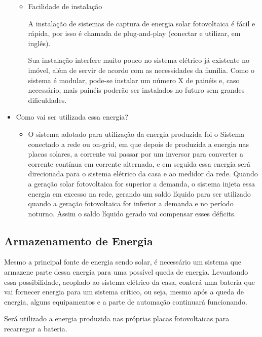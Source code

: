 \begin{itemize}
\begin{itemize}
                            \item Facilidade de instalação
                                \par A instalação de sistemas de captura de energia solar fotovoltaica é fácil e rápida, por isso é chamada de plug-and-play (conectar e utilizar, em inglês).
                                \par Sua instalação interfere muito pouco no sistema elétrico já existente no imóvel, além de servir de acordo com as necessidades da família. Como o sistema é modular, pode-se instalar um número X de painéis e, caso necessário, mais painéis poderão ser instalados no futuro sem grandes dificuldades.
        	            \end{itemize}
        	       \item Como vai ser utilizada essa energia?
	                    \begin{itemize}
	                        \item O sistema adotado para utilização da energia produzida foi o Sistema conectado a rede ou on-grid, em que depois de produzida a energia nas placas solares, a corrente vai passar por um inversor para converter a corrente contínua em corrente alternada, e em seguida essa energia será direcionada para o sistema elétrico da casa e ao medidor da rede. Quando a geração solar fotovoltaica for superior a demanda, o sistema injeta essa energia em excesso na rede, gerando um saldo líquido para ser utilizado quando a geração fotovoltaica for inferior a demanda e no período noturno. Assim o saldo líquido gerado vai compensar esses déficits.
	                    \end{itemize}
        	        \end{itemize}
        	 \subsection{Armazenamento de Energia}
        	    \par Mesmo a principal fonte de energia sendo solar, é necessário um sistema que armazene parte dessa energia para uma possível queda de energia. Levantando essa possibilidade, acoplado ao sistema elétrico da casa, conterá uma bateria que vai fornecer energia para um sistema crítico, ou seja, mesmo após a queda de energia, alguns equipamentos e a parte de automação continuará funcionando. 
                \par Será utilizado a energia produzida nas próprias placas fotovoltaicas para recarregar a bateria.
                
